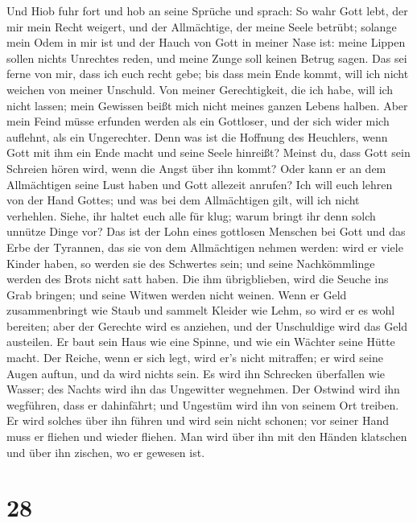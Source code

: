  Und Hiob fuhr fort und hob an seine Sprüche und sprach:
 So wahr Gott lebt, der mir mein Recht weigert, und der
Allmächtige, der meine Seele betrübt;  solange mein Odem
in mir ist und der Hauch von Gott in meiner Nase ist: 
meine Lippen sollen nichts Unrechtes reden, und meine Zunge soll keinen
Betrug sagen.  Das sei ferne von mir, dass ich euch recht
gebe; bis dass mein Ende kommt, will ich nicht weichen von meiner
Unschuld.  Von meiner Gerechtigkeit, die ich habe, will
ich nicht lassen; mein Gewissen beißt mich nicht meines ganzen Lebens
halben.  Aber mein Feind müsse erfunden werden als ein
Gottloser, und der sich wider mich auflehnt, als ein Ungerechter.
 Denn was ist die Hoffnung des Heuchlers, wenn Gott mit
ihm ein Ende macht und seine Seele hinreißt?  Meinst du,
dass Gott sein Schreien hören wird, wenn die Angst über ihn kommt?
 Oder kann er an dem Allmächtigen seine Lust haben und
Gott allezeit anrufen?  Ich will euch lehren von der Hand
Gottes; und was bei dem Allmächtigen gilt, will ich nicht verhehlen.
 Siehe, ihr haltet euch alle für klug; warum bringt ihr
denn solch unnütze Dinge vor?  Das ist der Lohn eines
gottlosen Menschen bei Gott und das Erbe der Tyrannen, das sie von dem
Allmächtigen nehmen werden:  wird er viele Kinder haben,
so werden sie des Schwertes sein; und seine Nachkömmlinge werden des
Brots nicht satt haben.  Die ihm übrigblieben, wird die
Seuche ins Grab bringen; und seine Witwen werden nicht weinen.
 Wenn er Geld zusammenbringt wie Staub und sammelt
Kleider wie Lehm,  so wird er es wohl bereiten; aber der
Gerechte wird es anziehen, und der Unschuldige wird das Geld austeilen.
 Er baut sein Haus wie eine Spinne, und wie ein Wächter
seine Hütte macht.  Der Reiche, wenn er sich legt, wird
er's nicht mitraffen; er wird seine Augen auftun, und da wird nichts
sein.  Es wird ihn Schrecken überfallen wie Wasser; des
Nachts wird ihn das Ungewitter wegnehmen.  Der Ostwind
wird ihn wegführen, dass er dahinfährt; und Ungestüm wird ihn von seinem
Ort treiben.  Er wird solches über ihn führen und wird
sein nicht schonen; vor seiner Hand muss er fliehen und wieder fliehen.
 Man wird über ihn mit den Händen klatschen und über ihn
zischen, wo er gewesen ist.

\hypertarget{section-27}{%
\section{28}\label{section-27}}

